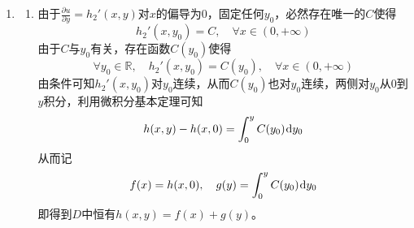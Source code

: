 \documentclass[a4paper,UTF8,fontset=windows,AutoFakeBold]{ctexart}
\newcommand*{\dr}{\hspace{0.07em}\mathrm{d}}
\newcommand*{\er}{\mathrm{e}}
\newcommand*{\rb}{\mathbb{R}}
\newcommand*{\note}{\noindent *}
\theoremstyle{ex}
\begin{document}
\begin{enumerate}
\begin{enumerate}
        \item
        利用初等函数与复合函数的连续性，验证条件并使用\textbf{洛必达法则}(利用变上限积分的导数结论)可得只需计算
        $$\lim_{x\to0}\big(1+f(2x-2\sin x+1,\sqrt[3]{1+x^3}+1)\big)^{\frac{1}{\ln(1+x^3)}}$$
        由指数函数连续性取$\ln$得只需计算
        $$\lim_{x\to0}\frac{\ln\big(1+f(2x-2\sin x+1,\sqrt[3]{1+x^3}+1)\big)}{\ln(1+x^3)}$$
        由于$t\to0$时$\ln(1+t)$与$t$等价，而$x\to0$时$x^3$与$f(2x-2\sin x+1,\sqrt[3]{1+x^3}+1)$极限均为0，从而可以进行推广的等价无穷小替换得到原极限为
        $$\lim_{x\to0}\frac{f(2x-2\sin x+1,\sqrt[3]{1+x^3}+1)}{x^3}$$
        \note 严格意义上这步过程需要保证$f(2x-2\sin x+1,\sqrt[3]{1+x^3}+1)$在0的某个邻域恒非零，这可以由两偏导均非零证明，或根据上学期讲义15.2.2的讨论跳过这部分证明。

        接下来我们分为四部分说明：
        \begin{itemize}
            \item 先分析$2x-2\sin x+1$，直接利用$\sin x$的泰勒展开可知
            $$2x-2\sin x+1=1+\frac{1}{3}x^3+o(x^3)$$
            \item 再分析$\sqrt[3]{1+x^3}+1$，利用推广的等价无穷小替换可知$\sqrt[3]{1+x^3}-1$与$\frac{1}{3}x^3$等价，从而进一步有(也可直接泰勒展开得到)
            $$\sqrt[3]{1+x^3}+1=2+\frac{1}{3}x^3+o(x^3)$$
            \item 利用$f$有连续偏导数，其可微，从而在$(1,2)$处有
            $$f(1+t,2+s)=f(1,2)+f_1'(1,2)t+f_2'(1,2)s+o(\sqrt{s^2+t^2})\quad(t,s)\to(0,0)$$
            利用(a)中的结论可得
            $$f(1+t,2+s)=5t-\frac{5}{2}s+o(\sqrt{s^2+t^2})\quad(t,s)\to(0,0)$$
            代入前两部分即得到$f(2x-2\sin x+1,\sqrt[3]{1+x^3}+1)$为
            $$5\cdot\frac{1}{3}x^3-\frac{5}{2}\cdot\frac{1}{3}x^3+\sqrt{o(x^3)^2+o(x^3)^2}=\frac{5}{6}x^3+\sqrt{o(x^3)^2+o(x^3)^2}$$
            \item 由定义与连续性可验证
            $$\lim_{x\to0}\frac{\sqrt{o(x^3)^2+o(x^3)^2}}{|x^3|}=\lim_{x\to0}\sqrt{\bigg(\frac{o(x^3)}{x^3}\bigg)^2+\bigg(\frac{o(x^3)}{x^3}\bigg)^2}=0$$
            从而可得$\sqrt{o(x^3)^2+o(x^3)^2}=o(x^3)$，进一步得到
            $$f(2x-2\sin x+1,\sqrt[3]{1+x^3}+1)=\frac{5}{6}x^3+o(x^3)$$
        \end{itemize}
        综合以上，最终得到
        $$\lim_{x\to0}\frac{f(2x-2\sin x+1,\sqrt[3]{1+x^3}+1)}{x^3}=\frac{5}{6}$$
        于是原极限为
        $$\er^{\frac{5}{6}}$$
    \end{enumerate}

    \item
    \begin{enumerate}
        \item 
        由于$\frac{\partial u}{\partial y}=h_2'(x,y)$对$x$的偏导为0，固定任何$y_0$，必然存在唯一的$C$使得
        $$h_2'(x,y_0)=C,\quad\forall x\in(0,+\infty)$$
        由于$C$与$y_0$有关，存在函数$C(y_0)$使得
        $$\forall y_0\in\rb,\quad h_2'(x,y_0)=C(y_0),\quad\forall x\in(0,+\infty)$$
        由条件可知$h_2'(x,y_0)$对$y_0$连续，从而$C(y_0)$也对$y_0$连续，两侧对$y_0$从0到$y$积分，利用微积分基本定理可知
        $$h(x,y)-h(x,0)=\int_0^yC(y_0)\dr y_0$$
        从而记
        $$f(x)=h(x,0),\quad g(y)=\int_0^yC(y_0)\dr y_0$$
        即得到$D$中恒有$h(x,y)=f(x)+g(y)$。


\end{enumerate}
\end{enumerate}
\end{document}

